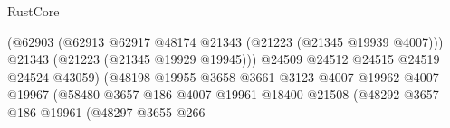 \begin{lexlean}{RustCore}
\begin{coremodule}
                                                              (@62903
                                                                (@62913
                                                                  @62917
                                                                  @48174
                                                                  @21343
                                                                  (@21223 (@21345 @19939 @4007)))
                                                                @21343
                                                                (@21223 (@21345 @19929 @19945)))
                                                              @24509
                                                              @24512
                                                              @24515
                                                              @24519
                                                              @24524
                                                              @43059)
                                                            (@48198
                                                              @19955
                                                              @3658
                                                              @3661
                                                              @3123
                                                              @4007
                                                              @19962
                                                              @4007
                                                              @19967
                                                              (@58480
                                                                @3657
                                                                @186
                                                                @4007
                                                                @19961
                                                                @18400
                                                                @21508
                                                                (@48292
                                                                  @3657
                                                                  @186
                                                                  @19961
                                                                  (@48297
                                                                    @3655
                                                                    @266

\end{coremodule}
\end{lexlean}
